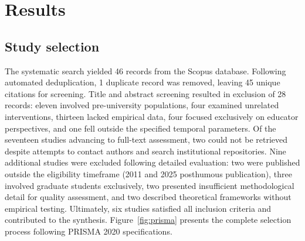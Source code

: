 \documentclass[
hf,
]{ceurart}
\begin{document}




\section{Results}

\subsection{Study selection}

The systematic search yielded 46 records from the Scopus database. Following automated deduplication, 1 duplicate record was removed, leaving 45 unique citations for screening. Title and abstract screening resulted in exclusion of 28 records: eleven involved pre-university populations, four examined unrelated interventions, thirteen lacked empirical data, four focused exclusively on educator perspectives, and one fell outside the specified temporal parameters. Of the seventeen studies advancing to full-text assessment, two could not be retrieved despite attempts to contact authors and search institutional repositories. Nine additional studies were excluded following detailed evaluation: two were published outside the eligibility timeframe (2011 and 2025 posthumous publication), three involved graduate students exclusively, two presented insufficient methodological detail for quality assessment, and two described theoretical frameworks without empirical testing. Ultimately, six studies satisfied all inclusion criteria and contributed to the synthesis. Figure~\ref{fig:prisma} presents the complete selection process following PRISMA 2020 specifications.
\end{document}
